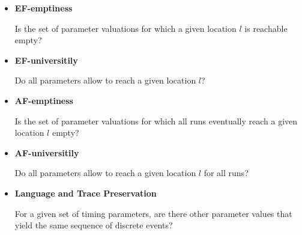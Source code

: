 \begin{itemize}
    \item \textbf{EF-emptiness}

    Is the set of parameter valuations for which a given location \( l \) is reachable empty?


    \item \textbf{EF-universitily}

    Do all parameters allow to reach a given location \( l \)?


    \item \textbf{AF-emptiness}

    Is the set of parameter valuations for which all runs eventually reach a given location \( l \) empty?


    \item \textbf{AF-universitily}

    Do all parameters allow to reach a given location \( l \) for all runs?


    \item \textbf{Language and Trace Preservation}

    For a given set of timing parameters, are there other parameter values that yield the same sequence of discrete events?

\end{itemize}
 

